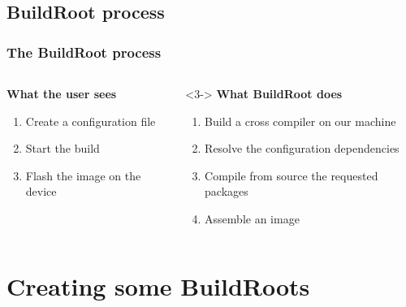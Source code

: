 \subsection{BuildRoot process}
\begin{frame}
  \frametitle{The BuildRoot process}
  \begin{columns}[t] %
    \begin{column}{.5\textwidth}
      \textbf{What the user sees}
      \begin{enumerate}
        \item<1-> Create a configuration file
        \item<2-> Start the build
        \item<4-> Flash the image on the device
      \end{enumerate}
    \end{column}
    \begin{column}{.5\textwidth}<3->
      \textbf{What BuildRoot does}
      \begin{enumerate}
        \item Build a cross compiler on our machine
        \item Resolve the configuration dependencies
        \item Compile from source the requested packages
        \item Assemble an image
      \end{enumerate}
    \end{column}
  \end{columns}
\end{frame}
\section{Creating some BuildRoots}
